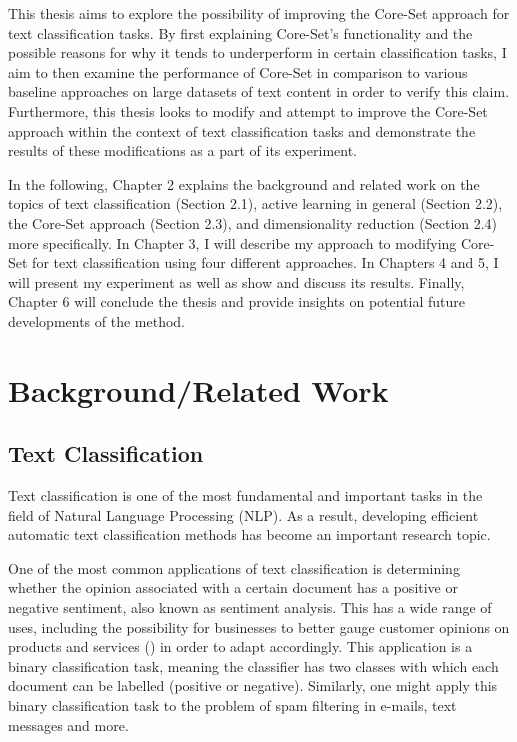 \documentclass[english,bachelor,ul]{webisthesis} %
\begin{document}
This thesis aims to explore the possibility of improving the Core-Set approach for text classification tasks. By first explaining Core-Set's functionality and the possible reasons for why it tends to underperform in certain classification tasks, I aim to then examine the performance of Core-Set in comparison to various baseline approaches on large datasets of text content in order to verify this claim. Furthermore, this thesis looks to modify and attempt to improve the Core-Set approach within the context of text classification tasks and demonstrate the results of these modifications as a part of its experiment.

In the following, Chapter 2 explains the background and related work on the topics of text classification (Section 2.1), active learning in general (Section 2.2), the Core-Set approach (Section 2.3), and dimensionality reduction (Section 2.4) more specifically. In Chapter 3, I will describe my approach to modifying Core-Set for text classification using four different approaches. In Chapters 4 and 5, I will present my experiment as well as show and discuss its results. Finally, Chapter 6 will conclude the thesis and provide insights on potential future developments of the method. 

\chapter{Background/Related Work}

\section{Text Classification}

Text classification is one of the most fundamental and important tasks in the field of Natural Language Processing (NLP). As a result, developing efficient automatic text classification methods has become an important research topic. 

One of the most common applications of text classification is determining whether the opinion associated with a certain document has a positive or negative sentiment, also known as sentiment analysis. This has a wide range of uses, including the possibility for businesses to better gauge customer opinions on products and services (\cite{DBLP:books/sp/mining2012/LiuZ12}) in order to adapt accordingly. This application is a binary classification task, meaning the classifier has two classes with which each document can be labelled (positive or negative). Similarly, one might apply this binary classification task to the problem of spam filtering in e-mails, text messages and more. 
\end{document}
